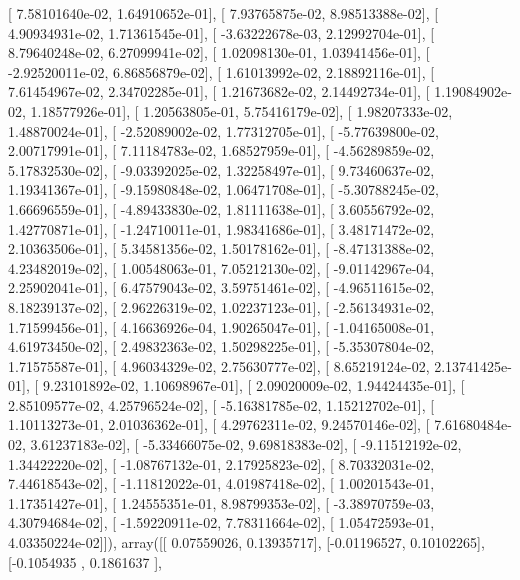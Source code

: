 \documentclass{article}
\begin{document}
       [  7.58101640e-02,   1.64910652e-01],
       [  7.93765875e-02,   8.98513388e-02],
       [  4.90934931e-02,   1.71361545e-01],
       [ -3.63222678e-03,   2.12992704e-01],
       [  8.79640248e-02,   6.27099941e-02],
       [  1.02098130e-01,   1.03941456e-01],
       [ -2.92520011e-02,   6.86856879e-02],
       [  1.61013992e-02,   2.18892116e-01],
       [  7.61454967e-02,   2.34702285e-01],
       [  1.21673682e-02,   2.14492734e-01],
       [  1.19084902e-02,   1.18577926e-01],
       [  1.20563805e-01,   5.75416179e-02],
       [  1.98207333e-02,   1.48870024e-01],
       [ -2.52089002e-02,   1.77312705e-01],
       [ -5.77639800e-02,   2.00717991e-01],
       [  7.11184783e-02,   1.68527959e-01],
       [ -4.56289859e-02,   5.17832530e-02],
       [ -9.03392025e-02,   1.32258497e-01],
       [  9.73460637e-02,   1.19341367e-01],
       [ -9.15980848e-02,   1.06471708e-01],
       [ -5.30788245e-02,   1.66696559e-01],
       [ -4.89433830e-02,   1.81111638e-01],
       [  3.60556792e-02,   1.42770871e-01],
       [ -1.24710011e-01,   1.98341686e-01],
       [  3.48171472e-02,   2.10363506e-01],
       [  5.34581356e-02,   1.50178162e-01],
       [ -8.47131388e-02,   4.23482019e-02],
       [  1.00548063e-01,   7.05212130e-02],
       [ -9.01142967e-04,   2.25902041e-01],
       [  6.47579043e-02,   3.59751461e-02],
       [ -4.96511615e-02,   8.18239137e-02],
       [  2.96226319e-02,   1.02237123e-01],
       [ -2.56134931e-02,   1.71599456e-01],
       [  4.16636926e-04,   1.90265047e-01],
       [ -1.04165008e-01,   4.61973450e-02],
       [  2.49832363e-02,   1.50298225e-01],
       [ -5.35307804e-02,   1.71575587e-01],
       [  4.96034329e-02,   2.75630777e-02],
       [  8.65219124e-02,   2.13741425e-01],
       [  9.23101892e-02,   1.10698967e-01],
       [  2.09020009e-02,   1.94424435e-01],
       [  2.85109577e-02,   4.25796524e-02],
       [ -5.16381785e-02,   1.15212702e-01],
       [  1.10113273e-01,   2.01036362e-01],
       [  4.29762311e-02,   9.24570146e-02],
       [  7.61680484e-02,   3.61237183e-02],
       [ -5.33466075e-02,   9.69818383e-02],
       [ -9.11512192e-02,   1.34422220e-02],
       [ -1.08767132e-01,   2.17925823e-02],
       [  8.70332031e-02,   7.44618543e-02],
       [ -1.11812022e-01,   4.01987418e-02],
       [  1.00201543e-01,   1.17351427e-01],
       [  1.24555351e-01,   8.98799353e-02],
       [ -3.38970759e-03,   4.30794684e-02],
       [ -1.59220911e-02,   7.78311664e-02],
       [  1.05472593e-01,   4.03350224e-02]]), array([[ 0.07559026,  0.13935717],
       [-0.01196527,  0.10102265],
       [-0.1054935 ,  0.1861637 ],
\end{document}
